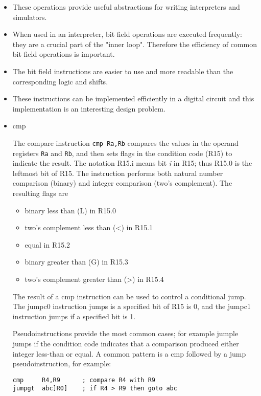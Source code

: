 \documentclass[11pt]{article}
\begin{document}
\begin{itemize}
\item These operations provide useful abstractions for writing
interpreters and simulators.
\item When used in an interpreter, bit field operations are executed
frequently: they are a crucial part of the "inner loop".  Therefore
the efficiency of common bit field operations is important.
\item The bit field instructions are easier to use and more readable than
the corresponding logic and shifts.
\item These instructions can be implemented efficiently in a digital
circuit and this implementation is an interesting design problem.
\end{itemize}

\begin{itemize}
\item cmp
\label{sec:orge5f187b}

The compare instruction \texttt{cmp Ra,Rb} compares the values in the operand
registers \texttt{Ra} and \texttt{Rb}, and then sets flags in the condition code
(R15) to indicate the result. The notation R15.i means bit \emph{i} in R15;
thus R15.0 is the leftmost bit of R15.  The instruction performs both
natural number comparison (binary) and integer comparison (two's
complement).  The resulting flags are

\begin{itemize}
\item binary less than (L) in R15.0
\item two's complement less than (<) in R15.1
\item equal in R15.2
\item binary greater than (G) in R15.3
\item two's complement greater than (>) in R15.4
\end{itemize}

The result of a cmp instruction can be used to control a conditional
jump.  The jumpc0 instruction jumps is a specified bit of R15 is 0,
and the jumpc1 instruction jumps if a specified bit is 1.

Pseudoinstructions provide the most common cases; for example jumple
jumps if the condition code indicates that a comparison produced
either integer less-than or equal.  A common pattern is a cmp followed
by a jump pseudoinstruction, for example:

\begin{verbatim}
cmp     R4,R9      ; compare R4 with R9
jumpgt  abc]R0]    ; if R4 > R9 then goto abc
\end{verbatim}


\end{itemize}
\end{document}
